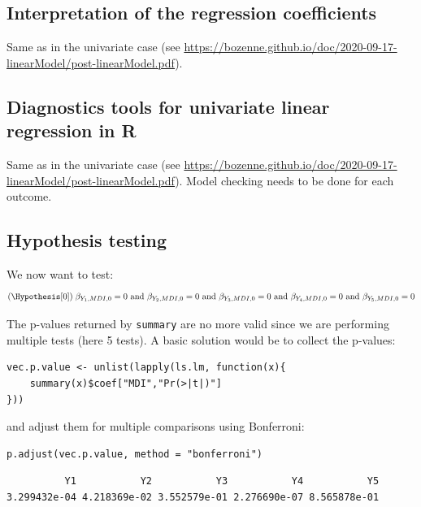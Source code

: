 \documentclass[12pt]{article}
\newcommand\Rlogo{\textbf{\textsf{R}}\xspace} %
\begin{document}
\subsection{Interpretation of the regression coefficients}
\label{sec:org9196ff8}

Same as in the univariate case (see
\url{https://bozenne.github.io/doc/2020-09-17-linearModel/post-linearModel.pdf}).

\subsection{Diagnostics tools for univariate linear regression in \Rlogo{}}
\label{sec:orgcb16e12}

Same as in the univariate case (see
\url{https://bozenne.github.io/doc/2020-09-17-linearModel/post-linearModel.pdf}). Model
checking needs to be done for each outcome.

\clearpage

\subsection{Hypothesis testing}
\label{sec:orgfe3c9b6}

We now want to test:
\begin{align*}
(\Hypothesis[0]) \; \beta_{Y_1, MDI, 0} = 0
 \text{ and } \beta_{Y_2, MDI, 0} = 0
 \text{ and } \beta_{Y_3, MDI, 0} = 0
 \text{ and } \beta_{Y_4, MDI, 0} = 0
 \text{ and } \beta_{Y_5, MDI, 0} = 0
\end{align*}

The p-values returned by \texttt{summary} are no more valid since we are
performing multiple tests (here 5 tests). A basic solution would be to
collect the p-values:
\lstset{language=r,label= ,caption= ,captionpos=b,numbers=none}
\begin{lstlisting}
vec.p.value <- unlist(lapply(ls.lm, function(x){
    summary(x)$coef["MDI","Pr(>|t|)"]
}))
\end{lstlisting}

and adjust them for multiple comparisons using Bonferroni:
\lstset{language=r,label= ,caption= ,captionpos=b,numbers=none}
\begin{lstlisting}
p.adjust(vec.p.value, method = "bonferroni")
\end{lstlisting}

\begin{verbatim}
          Y1           Y2           Y3           Y4           Y5 
3.299432e-04 4.218369e-02 3.552579e-01 2.276690e-07 8.565878e-01
\end{verbatim}
\end{document}
